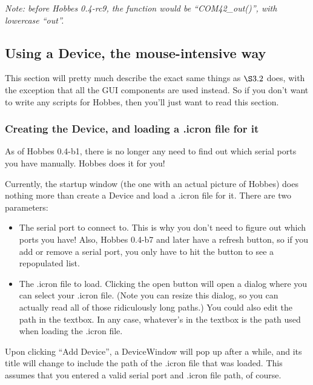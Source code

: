 \emph{Note: before Hobbes 0.4-rc9, the function would be ``COM42\_out()'', with lowercase ``out''.}



%
%
\subsection{Using a Device, the mouse-intensive way}
\label{3.3}

This section will pretty much describe the exact same things as \hyperref[3.2]{$\S3.2$} does, with the exception that all the GUI components are used instead. So if you don't want to write any scripts for Hobbes, then you'll just want to read this section.

\setcounter{subsubsection}{-1}



%
%

\subsubsection{Creating the Device, and loading a .icron file for it}
\label{3.3.0}

As of Hobbes 0.4-b1, there is no longer any need to find out which serial ports you have manually. Hobbes does it for you!

Currently, the startup window (the one with an actual picture of Hobbes) does nothing more than create a Device and load a .icron file for it. There are two parameters:
\begin{itemize}
\item The serial port to connect to. This is why you don't need to figure out which ports you have! Also, Hobbes 0.4-b7 and later have a refresh button, so if you add or remove a serial port, you only have to hit the button to see a repopulated list.
\item The .icron file to load. Clicking the open button will open a dialog where you can select your .icron file. (Note you can resize this dialog, so you can actually read all of those ridiculously long paths.) You could also edit the path in the textbox. In any case, whatever's in the textbox is the path used when loading the .icron file.
\end{itemize}

Upon clicking ``Add Device'', a DeviceWindow will pop up after a while, and its title will change to include the path of the .icron file that was loaded. This assumes that you entered a valid serial port and .icron file path, of course.

